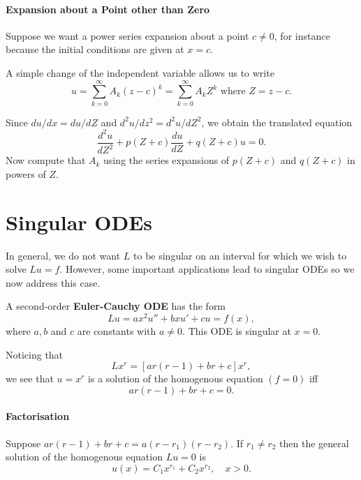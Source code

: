

\paragraph{Expansion about a Point other than Zero}
Suppose we want a power series expansion about a point \(c \neq 0\), for instance because the initial conditions are given at \(x = c\).

A simple change of the independent variable allows us to write
\[u = \sum_{k=0}^{\infty} A_k(z- c)^k = \sum_{k=0}^{\infty} A_kZ^k \text{ where } Z=z-c.\]

Since \(du / dx = du / dZ\) and \(d^2u/dz^2 = d^2u/dZ^2\), we obtain the translated equation
\[\frac{d^2u}{dZ^2} + p(Z + c) \frac{du}{dZ} + q(Z + c)u = 0.\]
Now compute that \(A_k\) using the series expansions of \(p(Z + c)\) and \(q(Z + c)\) in powers of \(Z\).

\section{Singular ODEs}
In general, we do not want \(L\) to be singular on an interval for which we wish to solve \(Lu = f\). However, some important applications lead to singular ODEs so we now address this case.

A second-order \textbf{Euler-Cauchy ODE} has the form
\[Lu = ax^2u'' + bxu' + cu = f(x),\]
where \(a, b\) and \(c\) are constants with \(a \neq 0\). This ODE is singular at \(x = 0\).

Noticing that
\[Lx^r = [ar(r - 1) + br + c]x^r,\]
we see that \(u = x^r\) is a solution of the homogenous equation \((f = 0)\) iff
\[ar(r - 1) + br + c = 0.\]

\paragraph{Factorisation}
Suppose \(ar(r - 1) + br + c = a(r - r_1)(r - r_2)\). If \(r_1 \neq r_2\) then the general solution of the homogenous equation \(Lu = 0\) is
\[u(x) = C_1x^{r_1} + C_2x^{r_2}, \quad x > 0.\]

